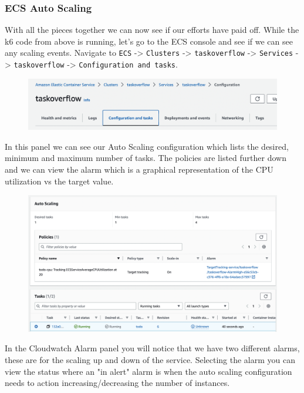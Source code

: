 \documentclass{csse4400}
\begin{document}
\subsubsection{ECS Auto Scaling}

With all the pieces together we can now see if our efforts have paid off.
While the k6 code from above is running, let's go to the ECS console and see if we can see any scaling events.
Navigate to \texttt{ECS} -> \texttt{Clusters} -> \texttt{taskoverflow} -> \texttt{Services} -> \texttt{taskoverflow} -> \texttt{Configuration and tasks}.

\begin{figure}[H]
  \begin{center}
    \includegraphics[width=\textwidth]{images/ecs1}
  \end{center}
\end{figure}

In this panel we can see our Auto Scaling configuration which lists the desired, minimum and maximum number of tasks. The policies are listed further down and we can view the alarm which is a graphical representation of the CPU utilization vs the target value.

\begin{figure}[H]
  \begin{center}
    \includegraphics[width=\textwidth]{images/ecs2}
  \end{center}
\end{figure}

In the Cloudwatch Alarm panel you will notice that we have two different alarms,
these are for the scaling up and down of the service.
Selecting the alarm you can view the status where an "in alert" alarm is when the auto scaling configuration needs to action increasing/decreasing the number of instances.
\end{document}
